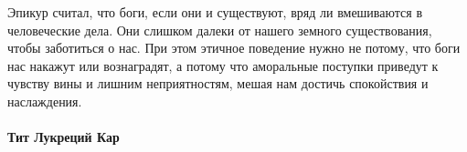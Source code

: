 

Эпикур считал, что боги, если они и существуют, вряд ли вмешиваются в человеческие дела. Они слишком далеки от нашего земного существования, чтобы заботиться о нас. При этом этичное поведение нужно не потому, что боги нас накажут или вознаградят, а потому что аморальные поступки приведут к чувству вины и лишним неприятностям, мешая нам достичь спокойствия и наслаждения.

\paragraph{Тит Лукреций Кар}

